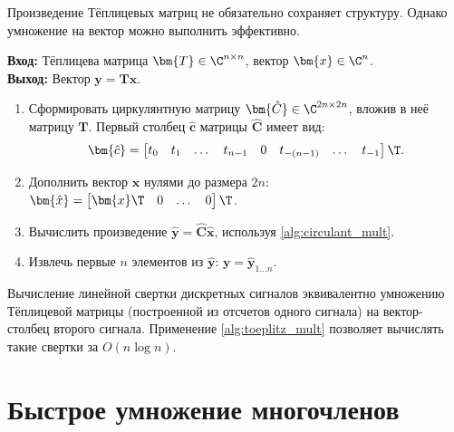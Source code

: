 Произведение Тёплицевых матриц не обязательно сохраняет структуру. Однако умножение на вектор можно выполнить эффективно.

\begin{tcbalgorithmbox}
\label{alg:toeplitz_mult}
    \textbf{Вход:} Тёплицева матрица $\bm{T} \in \C^{n \times n}$, вектор $\bm{x} \in \C^n$.\\
    \textbf{Выход:} Вектор $\bm{y} = \bm{T}\bm{x}$.
    \begin{enumerate}
        \item Сформировать циркулянтную матрицу $\bm{\hat{C}} \in \C^{2n \times 2n}$, вложив в неё матрицу $\bm{T}$. Первый столбец $\bm{\hat{c}}$ матрицы $\bm{\hat{C}}$ имеет вид:
        \begin{equation*}
            \bm{\hat{c}} = \begin{bmatrix} t_0 & t_1 & \dots & t_{n-1} & 0 & t_{-(n-1)} & \dots & t_{-1} \end{bmatrix}\T.
        \end{equation*}
        \item Дополнить вектор $\bm{x}$ нулями до размера $2n$: 
        $\bm{\hat{x}} = \begin{bmatrix} \bm{x}\T & 0 & \dots & 0 \end{bmatrix}\T$.
        \item Вычислить произведение $\bm{\hat{y}} = \bm{\hat{C}} \bm{\hat{x}}$, используя \cref{alg:circulant_mult}.
        \item Извлечь первые $n$ элементов из $\bm{\hat{y}}$: $\bm{y} = \bm{\hat{y}}_{1 \dots n}$.
    \end{enumerate}
\end{tcbalgorithmbox}

\begin{tcbexample}
\label{ex:convolution}
    Вычисление линейной свертки дискретных сигналов эквивалентно умножению Тёплицевой матрицы (построенной из отсчетов одного сигнала) на вектор-столбец второго сигнала. Применение \cref{alg:toeplitz_mult} позволяет вычислять такие свертки за $O(n \log n)$.
\end{tcbexample}

\section{Быстрое умножение многочленов}
\label{sec:polynomials}

